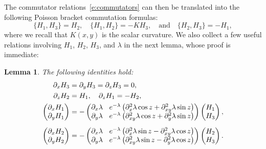 \documentclass[JEP,XML,SOM,Unicode, NoEqCountersInSection,published]{cedram}
\theoremstyle{plain}
\newtheorem{lemm}[theo]{Lemma}
\theoremstyle{definition}
\theoremstyle{remark}
\begin{document}
The commutator relations~\eqref{e:commutators} can then be translated into the following Poisson bracket commutation formulas:
\begin{equation}\label{e:commutators-hamiltonian}
\{H_1,H_3\}=H_2,\quad \{H_1,H_2\}=-KH_3,\quad\text{and}\quad\{H_2,H_3\}=-H_1,
\end{equation}
where we recall that $K(x,y)$ is the scalar curvature. We also collect a few useful relations involving $H_1$, $H_2$, $H_3$, and $\lambda$ in the next lemma, whose proof is immediate:

\begin{lemm} The following identities hold:
\begin{align}
\label{e:trivial-relation-H3}\partial_xH_3 & =\partial_yH_3=\partial_zH_3=0, \\
\label{e:intertwine-H1H2}\partial_zH_2 & =H_1,\quad \partial_zH_1=-H_2, \\
\label{e:derivative-H1}
\begin{pmatrix} \partial_xH_1\\ \partial_yH_1\end{pmatrix} &\arraycolsep4.5pt =-\begin{pmatrix} \partial_x\lambda &e^{-\lambda}\left(\partial_x^2\lambda \cos z+\partial^2_{xy}\lambda\sin z\right) \\ \partial_y\lambda &e^{-\lambda}\left(\partial_{xy}^2\lambda \cos z+\partial^2_{y}\lambda\sin z\right) \end{pmatrix}\begin{pmatrix} H_1\\H_3\end{pmatrix}, \\[5pt]
\label{e:derivative-H2}
\begin{pmatrix} \partial_xH_2\\ \partial_yH_2\end{pmatrix} &\arraycolsep4.5pt =-\begin{pmatrix} \partial_x\lambda &e^{-\lambda}\left(\partial_x^2\lambda \sin z-\partial^2_{xy}\lambda\cos z\right) \\ \partial_y\lambda &e^{ -\lambda}\left(\partial_{xy}^2\lambda \sin z-\partial^2_{y}\lambda\cos z\right) \end{pmatrix}\begin{pmatrix} H_2\\H_3\end{pmatrix}.
\end{align}
\end{lemm}
\end{document}
